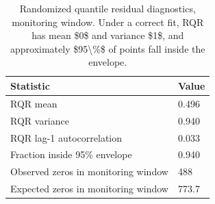 \begin{table}

\caption{Randomized quantile residual diagnostics, monitoring window. Under a correct fit, RQR has mean \$0\$ and variance \$1\$, and approximately \$95\textbackslash{}\%\$ of points fall inside the envelope.}
\centering
\begin{tabular}[t]{ll}
\toprule
Statistic & Value\\
\midrule
RQR mean & 0.496\\
RQR variance & 0.940\\
RQR lag-1 autocorrelation & 0.033\\
Fraction inside 95\% envelope & 0.940\\
Observed zeros in monitoring window & 488\\
\addlinespace
Expected zeros in monitoring window & 773.7\\
\bottomrule
\end{tabular}
\end{table}
